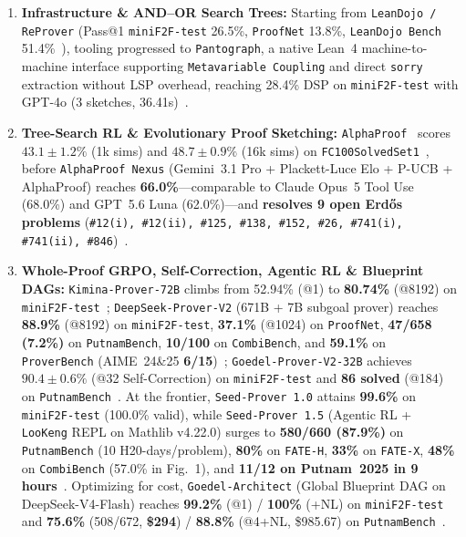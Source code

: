 \documentclass[10pt,twocolumn]{article}
\begin{document}
\begin{enumerate}
  \item \textbf{Infrastructure \& AND--OR Search Trees:} Starting from \texttt{LeanDojo / ReProver} (Pass@1 \texttt{miniF2F-test} 26.5\%, \texttt{ProofNet} 13.8\%, \texttt{LeanDojo Bench} 51.4\%~\cite{yang2023leandojo}), tooling progressed to \texttt{Pantograph}, a native Lean~4 machine-to-machine interface supporting \texttt{Metavariable Coupling} and direct \texttt{sorry} extraction without LSP overhead, reaching 28.4\% DSP on \texttt{miniF2F-test} with GPT-4o (3 sketches, 36.41s)~\cite{aniva2025pantograph}.
  \item \textbf{Tree-Search RL \& Evolutionary Proof Sketching:} \texttt{AlphaProof}~\cite{hubert2025alphaproof} scores \textbf{$43.1 \pm 1.2\%$} (1k sims) and \textbf{$48.7 \pm 0.9\%$} (16k sims) on \texttt{FC100SolvedSet1}~\cite{firsching2026formalconjectures}, before \texttt{AlphaProof Nexus} (Gemini~3.1 Pro + Plackett-Luce Elo + P-UCB + AlphaProof) reaches \textbf{66.0\%}---comparable to Claude Opus~5 Tool Use (68.0\%) and GPT~5.6 Luna (62.0\%)---and \textbf{resolves 9 open Erd\H{o}s problems} (\texttt{\#12(i), \#12(ii), \#125, \#138, \#152, \#26, \#741(i), \#741(ii), \#846})~\cite{tsoukalas2026nexus}.
  \item \textbf{Whole-Proof GRPO, Self-Correction, Agentic RL \& Blueprint DAGs:} \texttt{Kimina-Prover-72B} climbs from 52.94\% (@1) to \textbf{80.74\%} (@8192) on \texttt{miniF2F-test}~\cite{wang2025kimina}; \texttt{DeepSeek-Prover-V2} (671B + 7B subgoal prover) reaches \textbf{88.9\%} (@8192) on \texttt{miniF2F-test}, \textbf{37.1\%} (@1024) on \texttt{ProofNet}, \textbf{47/658 (7.2\%)} on \texttt{PutnamBench}, \textbf{10/100} on \texttt{CombiBench}, and \textbf{59.1\%} on \texttt{ProverBench} (AIME~24\&25 \textbf{6/15})~\cite{ren2025deepseekproverv2}; \texttt{Goedel-Prover-V2-32B} achieves \textbf{$90.4 \pm 0.6\%$} (@32 Self-Correction) on \texttt{miniF2F-test} and \textbf{86 solved} (@184) on \texttt{PutnamBench}~\cite{lin2026goedelproverv2}. At the frontier, \texttt{Seed-Prover 1.0} attains \textbf{99.6\%} on \texttt{miniF2F-test} (100.0\% valid), while \texttt{Seed-Prover 1.5} (Agentic RL + \texttt{LooKeng} REPL on Mathlib v4.22.0) surges to \textbf{580/660 (87.9\%)} on \texttt{PutnamBench} (10 H20-days/problem), \textbf{80\%} on \texttt{FATE-H}, \textbf{33\%} on \texttt{FATE-X}, \textbf{48\%} on \texttt{CombiBench} (57.0\% in Fig.~1), and \textbf{11/12 on Putnam~2025 in 9 hours}~\cite{chen2025seedprover,chen2025seedprover15}. Optimizing for cost, \texttt{Goedel-Architect} (Global Blueprint DAG on DeepSeek-V4-Flash) reaches \textbf{99.2\%} (@1) / \textbf{100\%} (+NL) on \texttt{miniF2F-test} and \textbf{75.6\%} (508/672, \textbf{\$294}) / \textbf{88.8\%} (@4+NL, \$985.67) on \texttt{PutnamBench}~\cite{chung2026goedelarchitect}.

\end{enumerate}
\end{document}
